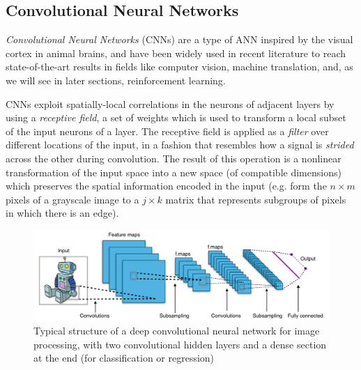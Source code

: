 \subsection{Convolutional Neural Networks} \label{s:CNN}
\textit{Convolutional Neural Networks} (CNNs) are a type of ANN inspired by the 
visual cortex in animal brains, and have been widely used in recent literature 
to reach state-of-the-art results in fields like computer vision, machine 
translation, and, as we will see in later sections, reinforcement learning.

CNNs exploit spatially-local correlations in the neurons of adjacent 
layers by using a \textit{receptive field}, a set of weights which is used to 
transform a local subset of the input neurons of a layer.
The receptive field is applied as a \textit{filter} over different locations of 
the input, in a fashion that resembles how a signal is \textit{strided} across 
the other during convolution. 
The result of this operation is a nonlinear transformation of 
the input space into a new space (of compatible dimensions) which preserves
the spatial information encoded in the input (e.g. form the $n \times m$ pixels
of a grayscale image to a $j \times k$ matrix that represents subgroups of 
pixels in which there is an edge).
%
\begin{figure}[h]
\includegraphics[width=	\textwidth]{pictures/CNN}
\centering
\caption[CNN for image processing]{Typical structure of a deep convolutional 
	neural network for image processing, with two convolutional hidden 
	layers and a dense section at the end (for classification or regression)}
\end{figure}
%

